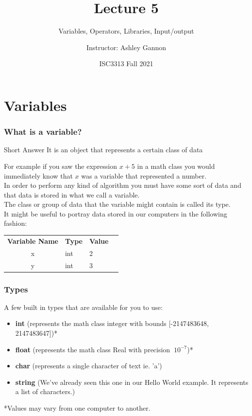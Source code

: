 \documentclass{if-beamer}
\title[Lecture 5]{Lecture 5}
\subtitle{Variables, Operators, Libraries, Input/output}
\author{Instructor: Ashley Gannon}
\date{ISC3313 Fall 2021}
\begin{document}
\begin{frame}
  \titlepage
\end{frame}
\section{Variables}

\begin{frame}
\frametitle{What is a variable?}
\begin{block}{Short Answer} It is an object that represents a certain class of data \end{block}
For example if you saw the expression $x + 5$ in a math class you would immediately know that $x$ was a variable that represented a number. \\
\medskip
In order to perform any kind of algorithm you must have some sort of data and that data is stored in what we call a variable. \\
\medskip
The class or group of data that the variable might contain is called its type. \\
\medskip
It might be useful to portray data stored in our computers in the following fashion:
\begin{table}
	\begin{tabular}{cl l l}
		\textbf{Variable Name} & \textbf{Type} & \textbf{Value}\\
		x & int & 2 \\
		y & int & 3 \\	
	\end{tabular}
\end{table}
\end{frame}

\begin{frame}
\frametitle{Types}
A few built in types that are available for you to use:
\begin{itemize}
\item \textbf{int} (represents the math class integer with bounds [-2147483648, 2147483647])*
\item \textbf{float} (represents the math class Real with precision $~10^{-7}$)*
\item \textbf{char} (represents a single character of text ie. 'a')
\item \textbf{string} (We've already seen this one in our Hello World example. It represents a list of characters.)
\end{itemize}
\medskip
*Values may vary from one computer to another.
\end{frame}
\end{document}
